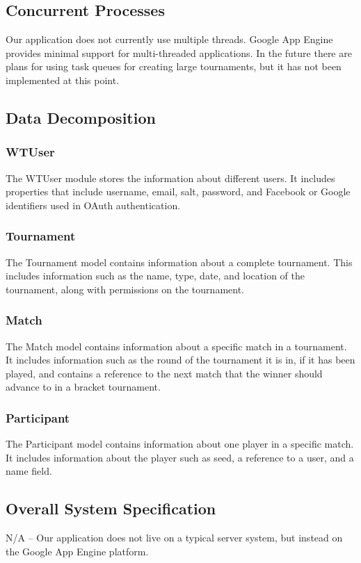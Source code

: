 \documentclass{article}
\begin{document}
\newpage
\subsection{Concurrent Processes}
Our application does not currently use multiple threads. Google App Engine provides minimal support for multi-threaded applications.  In the future there are plans for using task queues for creating large tournaments, but it has not been implemented at this point.

\subsection{Data Decomposition}
\subsubsection{WTUser}
The WTUser module stores the information about different users. It includes properties that include username, email, salt, password, and Facebook or Google identifiers used in OAuth authentication.

\subsubsection{Tournament}
The Tournament model contains information about a complete tournament. This includes information such as the name, type, date, and location of the tournament, along with permissions on the tournament.

\subsubsection{Match}
The Match model contains information about a specific match in a tournament. It includes information such as the round of the tournament it is in, if it has been played, and contains a reference to the next match that the winner should advance to in a bracket tournament.

\subsubsection{Participant}
The Participant model contains information about one player in a specific match. It includes information about the player such as seed, a reference to a user, and a name field.

\subsection{Overall System Specification}
N/A – Our application does not live on a typical server system, but instead on the Google App Engine platform.
\end{document}
